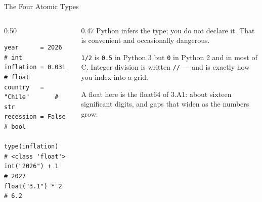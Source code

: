 \begin{frame}[fragile]{The Four Atomic Types}
\begin{columns}[T]
\begin{column}{0.50\textwidth}
\begin{lstlisting}
year      = 2026          # int
inflation = 0.031         # float
country   = "Chile"       # str
recession = False         # bool

type(inflation)           # <class 'float'>
int("2026") + 1           # 2027
float("3.1") * 2          # 6.2
\end{lstlisting}
\end{column}
\begin{column}{0.47\textwidth}
\small
Python infers the type; you do not declare it. That is convenient and occasionally dangerous.
\medskip
\begin{cautionbox}\footnotesize
\texttt{1/2} is \texttt{0.5} in Python 3 but \texttt{0} in Python 2 and in most of C. Integer division is written \texttt{//} --- and is exactly how you index into a grid.
\end{cautionbox}
\medskip
\begin{examplebox}\footnotesize
A float here is the float64 of 3.A1: about sixteen significant digits, and gaps that widen as the numbers grow.
\end{examplebox}
\end{column}
\end{columns}
\vspace{1mm}
\end{frame}

